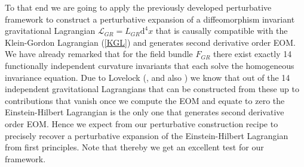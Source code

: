 \documentclass[a4paper,12pt, DIV=14, BCOR=5mm, twoside, headsepline]{scrbook}
\begin{document}
To that end we are going to apply the previously developed perturbative framework to construct a perturbative expansion of a diffeomorphism invariant gravitational Lagrangian $\mathcal{L}_{GR} = L_{GR} \mathrm{d}^4x$ that is causally compatible with the Klein-Gordon Lagrangian (\ref{KGL}) and generates second derivative order EOM. 
We have already remarked that for the field bundle $F_{GR}$ there exist exactly 14 functionally independent curvature invariants that each solve the homogeneous invariance equation. Due to Lovelock (\cite{Lovelock1969}, \cite{doi:10.1063/1.1665613} and also \cite{doi:10.1063/1.1666069}) we know that out of the 14 independent gravitational Lagrangians that can be constructed from these up to contributions that vanish once we compute the EOM and equate to zero the Einstein-Hilbert Lagrangian is the only one that generates second derivative order EOM. 
Hence we expect from our perturbative construction recipe to precisely recover a perturbative expansion of the Einstein-Hilbert Lagrangian from first principles. Note that thereby we get an excellent test for our framework. \\
\end{document}
